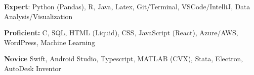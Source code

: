  \textbf{Expert}: Python (Pandas), R, Java, Latex, Git/Terminal, VSCode/IntelliJ, Data Analysis/Visualization

 \textbf{Proficient:} C, SQL, HTML (Liquid), CSS, JavaScript (React), Azure/AWS, WordPress, Machine Learning

 \textbf{Novice} Swift, Android Studio, Typescript, MATLAB (CVX), Stata, Electron, AutoDesk Inventor